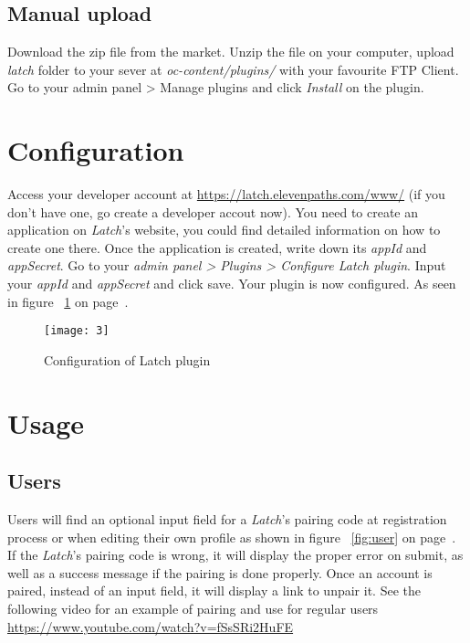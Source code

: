 \documentclass[
10pt,
a4paper,
oneside,
headinclude,footinclude,
BCOR5mm,
]{scrartcl}
\begin{document}
\subsection{Manual upload}
Download the zip file from the market. Unzip the file on your computer, upload \textit{latch} folder to your sever at \textit{oc-content/plugins/} with your favourite FTP Client. Go to your admin panel > Manage plugins and click \textit{Install} on the plugin.


\section{Configuration}
Access your developer account at \href{https://latch.elevenpaths.com/www/}{https://latch.elevenpaths.com/www/} (if you don't have one, go create a developer accout now). You need to create an application on \textit{Latch}'s website, you could find detailed information on how to create one there. Once the application is created, write down its \textit{appId} and \textit{appSecret}. Go to your \textit{admin panel > Plugins > Configure Latch plugin}. Input your \textit{appId} and \textit{appSecret} and click save. Your plugin is now configured. As seen in figure ~\ref{fig:configuration} on page~\pageref{fig:configuration}.



\begin{figure}[h!]
  \begin{center}
    \texttt{[image: 3]}
    \caption{Configuration of Latch plugin}
    \label{fig:configuration}
  \end{center}
\end{figure}


\section{Usage}
\subsection{Users}
Users will find an optional input field for a \textit{Latch}'s pairing code at registration process or when editing their own profile as shown in figure ~\ref{fig:user} on page~\pageref{fig:user}. If the \textit{Latch}'s pairing code is wrong, it will display the proper error on submit, as well as a success message if the pairing is done properly. Once an account is paired, instead of an input field, it will display a link to unpair it.  See the following video for an example of pairing and use for regular users \href{https://www.youtube.com/watch?v=fSsSRi2HuFE}{https://www.youtube.com/watch?v=fSsSRi2HuFE}
\end{document}
